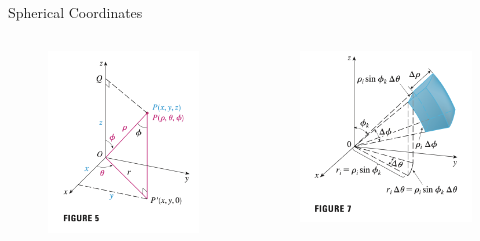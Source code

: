 \documentclass[aspectratio=169, UTF8]{beamer}
\begin{document}
\begin{frame}{Spherical Coordinates}
\begin{columns}
        \begin{column}{0.35\textwidth}
            \begin{figure}
                \centering
                \includegraphics[width=0.8\linewidth]{sc_1.png}
            \end{figure}
        \end{column}
        \begin{column}{0.35\textwidth}
            \begin{figure}
                \centering
                \includegraphics[width=0.8\linewidth]{sc_2.png}
            \end{figure}
        \end{column}
    \end{columns}

\end{frame}
\end{document}

